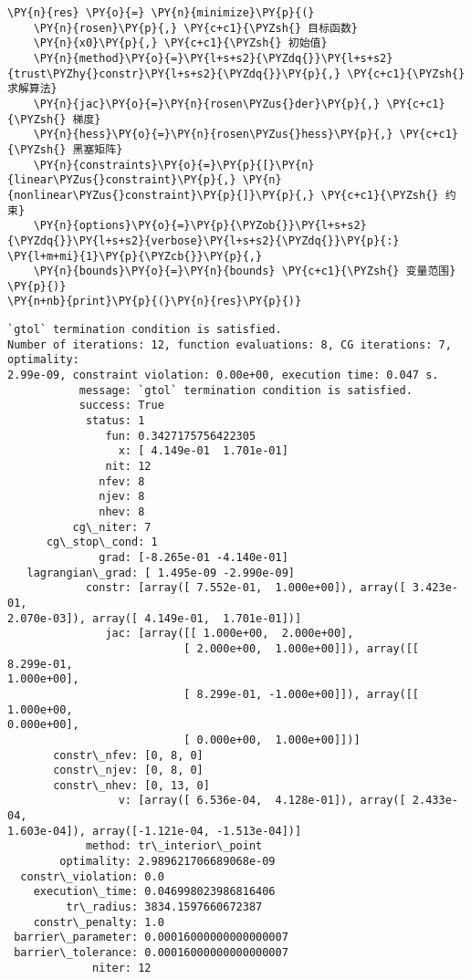     \begin{tcolorbox}[breakable, size=fbox, boxrule=1pt, pad at break*=1mm,colback=cellbackground, colframe=cellborder]
\begin{Verbatim}[commandchars=\\\{\}]
\PY{n}{res} \PY{o}{=} \PY{n}{minimize}\PY{p}{(}
    \PY{n}{rosen}\PY{p}{,} \PY{c+c1}{\PYZsh{} 目标函数}
    \PY{n}{x0}\PY{p}{,} \PY{c+c1}{\PYZsh{} 初始值}
    \PY{n}{method}\PY{o}{=}\PY{l+s+s2}{\PYZdq{}}\PY{l+s+s2}{trust\PYZhy{}constr}\PY{l+s+s2}{\PYZdq{}}\PY{p}{,} \PY{c+c1}{\PYZsh{} 求解算法}
    \PY{n}{jac}\PY{o}{=}\PY{n}{rosen\PYZus{}der}\PY{p}{,} \PY{c+c1}{\PYZsh{} 梯度}
    \PY{n}{hess}\PY{o}{=}\PY{n}{rosen\PYZus{}hess}\PY{p}{,} \PY{c+c1}{\PYZsh{} 黑塞矩阵}
    \PY{n}{constraints}\PY{o}{=}\PY{p}{[}\PY{n}{linear\PYZus{}constraint}\PY{p}{,} \PY{n}{nonlinear\PYZus{}constraint}\PY{p}{]}\PY{p}{,} \PY{c+c1}{\PYZsh{} 约束}
    \PY{n}{options}\PY{o}{=}\PY{p}{\PYZob{}}\PY{l+s+s2}{\PYZdq{}}\PY{l+s+s2}{verbose}\PY{l+s+s2}{\PYZdq{}}\PY{p}{:} \PY{l+m+mi}{1}\PY{p}{\PYZcb{}}\PY{p}{,} 
    \PY{n}{bounds}\PY{o}{=}\PY{n}{bounds} \PY{c+c1}{\PYZsh{} 变量范围}
\PY{p}{)}
\PY{n+nb}{print}\PY{p}{(}\PY{n}{res}\PY{p}{)}
\end{Verbatim}
\end{tcolorbox}

    \begin{Verbatim}[commandchars=\\\{\}]
`gtol` termination condition is satisfied.
Number of iterations: 12, function evaluations: 8, CG iterations: 7, optimality:
2.99e-09, constraint violation: 0.00e+00, execution time: 0.047 s.
           message: `gtol` termination condition is satisfied.
           success: True
            status: 1
               fun: 0.3427175756422305
                 x: [ 4.149e-01  1.701e-01]
               nit: 12
              nfev: 8
              njev: 8
              nhev: 8
          cg\_niter: 7
      cg\_stop\_cond: 1
              grad: [-8.265e-01 -4.140e-01]
   lagrangian\_grad: [ 1.495e-09 -2.990e-09]
            constr: [array([ 7.552e-01,  1.000e+00]), array([ 3.423e-01,
2.070e-03]), array([ 4.149e-01,  1.701e-01])]
               jac: [array([[ 1.000e+00,  2.000e+00],
                           [ 2.000e+00,  1.000e+00]]), array([[ 8.299e-01,
1.000e+00],
                           [ 8.299e-01, -1.000e+00]]), array([[ 1.000e+00,
0.000e+00],
                           [ 0.000e+00,  1.000e+00]])]
       constr\_nfev: [0, 8, 0]
       constr\_njev: [0, 8, 0]
       constr\_nhev: [0, 13, 0]
                 v: [array([ 6.536e-04,  4.128e-01]), array([ 2.433e-04,
1.603e-04]), array([-1.121e-04, -1.513e-04])]
            method: tr\_interior\_point
        optimality: 2.989621706689068e-09
  constr\_violation: 0.0
    execution\_time: 0.046998023986816406
         tr\_radius: 3834.1597660672387
    constr\_penalty: 1.0
 barrier\_parameter: 0.00016000000000000007
 barrier\_tolerance: 0.00016000000000000007
             niter: 12
    \end{Verbatim}

